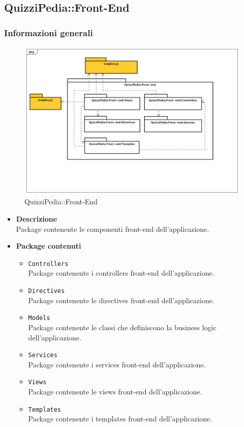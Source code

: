 \subsection{QuizziPedia::Front-End}
\subsubsection{Informazioni generali}
\label{QuizziPedia::Front-End}
\begin{figure}
	\centering
	\includegraphics[scale=0.45]{UML/Package/QuizziPedia_Front-end.png}
	\caption{QuizziPedia::Front-End}
\end{figure}

	\begin{itemize}
		\item \textbf{Descrizione} \\ Package contenente le componenti front-end dell'applicazione.
		\item \textbf{Package contenuti}
		\begin{itemize}
			\item \texttt{Controllers} \\ Package contenente i controllers front-end dell'applicazione.
			\item \texttt{Directives} \\ Package contenente le directives front-end dell'applicazione.
			\item \texttt{Models} \\ Package contenente le classi che definiscono la business logic dell'applicazione.
			\item \texttt{Services} \\ Package contenente i services front-end dell'applicazione.
			\item \texttt{Views} \\ Package contenente le views front-end dell'applicazione.
			\item \texttt{Templates} \\ Package contenente i templates front-end dell'applicazione.
		\end{itemize}
	\end{itemize}
	